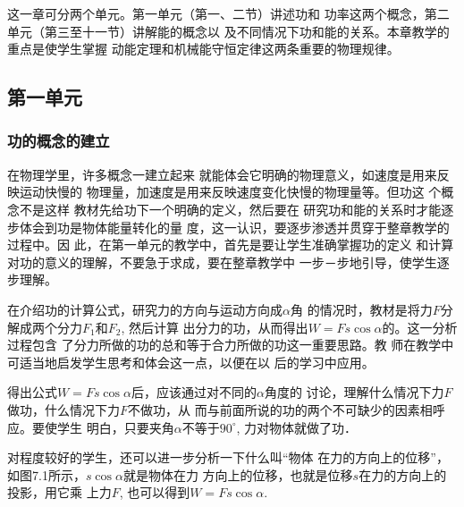 这一章可分两个单元。第一单元（第一、二节）讲述功和
功率这两个概念，第二单元（第三至十一节）讲解能的概念以
及不同情况下功和能的关系。本章教学的重点是使学生掌握
动能定理和机械能守恒定律这两条重要的物理规律。

\subsection{第一单元}
\subsubsection{功的概念的建立}

在物理学里，许多概念一建立起来
就能体会它明确的物理意义，如速度是用来反映运动快慢的
物理量，加速度是用来反映速度变化快慢的物理量等。但功这
个概念不是这样 教材先给功下一个明确的定义，然后要在
研究功和能的关系时才能逐步体会到功是物体能量转化的量
度，这一认识，要逐步渗透并贯穿于整章教学的过程中。因
此，在第一单元的教学中，首先是要让学生准确掌握功的定义
和计算 对功的意义的理解，不要急于求成，要在整章教学中
一步－步地引导，使学生逐步理解。

在介绍功的计算公式，研究力的方向与运动方向成$\alpha$角
的情况时，教材是将力$F$分解成两个分力$F_1$和$F_2$, 然后计算
出分力的功，从而得出$W=Fs\cos\alpha$的。这一分析过程包含
了分力所做的功的总和等于合力所做的功这一重要思路。教
师在教学中可适当地启发学生思考和体会这一点，以便在以
后的学习中应用。

得出公式$W=Fs\cos\alpha$后，应该通过对不同的$\alpha$角度的
讨论，理解什么情况下力$F$做功，什么情况下力$F$不做功，从
而与前面所说的功的两个不可缺少的因素相呼应。要使学生
明白，只要夹角$\alpha$不等于$90^{\circ}$, 力对物体就做了功．

对程度较好的学生，还可以进一步分析一下什么叫“物体
在力的方向上的位移”，如图7.1所示，$s\cos\alpha$就是物体在力
方向上的位移，也就是位移$s$在力的方向上的投影，用它乘
上力$F$, 也可以得到$W=Fs\cos\alpha$.
\begin{figure}[htp]
    \centering
{}
    \caption{}
\end{figure}

